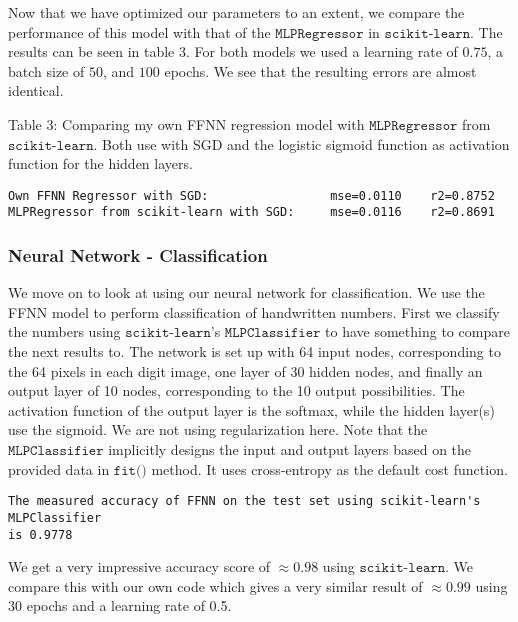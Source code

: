 \documentclass[11pt]{article}
\begin{document}
    Now that we have optimized our parameters to an extent, we compare the
performance of this model with that of the \(\texttt{MLPRegressor}\) in
\(\texttt{scikit-learn}\). The results can be seen in table 3. For both
models we used a learning rate of \(0.75\), a batch size of \(50\), and
\(100\) epochs. We see that the resulting errors are almost identical.

    Table 3: Comparing my own FFNN regression model with
\(\texttt{MLPRegressor}\) from \(\texttt{scikit-learn}\). Both use with
SGD and the logistic sigmoid function as activation function for the
hidden layers.


    \begin{Verbatim}[commandchars=\\\{\}]
Own FFNN Regressor with SGD:                 mse=0.0110    r2=0.8752
MLPRegressor from scikit-learn with SGD:     mse=0.0116    r2=0.8691
    \end{Verbatim}

    \hypertarget{neural-network---classification}{%
\subsubsection{Neural Network -
Classification}\label{neural-network---classification}}

We move on to look at using our neural network for classification. We
use the FFNN model to perform classification of handwritten numbers.
First we classify the numbers using \(\texttt{scikit-learn}\)'s
\(\texttt{MLPClassifier}\) to have something to compare the next results
to. The network is set up with 64 input nodes, corresponding to the 64
pixels in each digit image, one layer of 30 hidden nodes, and finally an
output layer of 10 nodes, corresponding to the 10 output possibilities.
The activation function of the output layer is the softmax, while the
hidden layer(s) use the sigmoid. We are not using regularization here.
Note that the \(\texttt{MLPClassifier}\) implicitly designs the input
and output layers based on the provided data in \(\texttt{fit()}\)
method. It uses cross-entropy as the default cost function.

    \begin{Verbatim}[commandchars=\\\{\}]
The measured accuracy of FFNN on the test set using scikit-learn's MLPClassifier
is 0.9778
    \end{Verbatim}

    We get a very impressive accuracy score of \(\approx0.98\) using
\(\texttt{scikit-learn}\). We compare this with our own code which gives
a very similar result of \(\approx0.99\) using 30 epochs and a learning
rate of 0.5.
\end{document}
